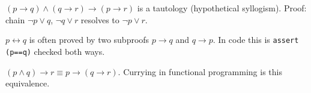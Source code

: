 \begin{example}
$(p\to q)\land(q\to r)\to(p\to r)$ is a tautology (hypothetical syllogism). Proof: chain $\neg p\lor q$, $\neg q\lor r$ resolves to $\neg p\lor r$.
\end{example}

\begin{remark}
$p\leftrightarrow q$ is often proved by two subproofs $p\to q$ and $q\to p$. In code this is \texttt{assert (p==q)} checked both ways.
\end{remark}

\begin{theorem}[Exportation]
$(p\land q)\to r\equiv p\to(q\to r)$. Currying in functional programming is this equivalence.
\end{theorem}

